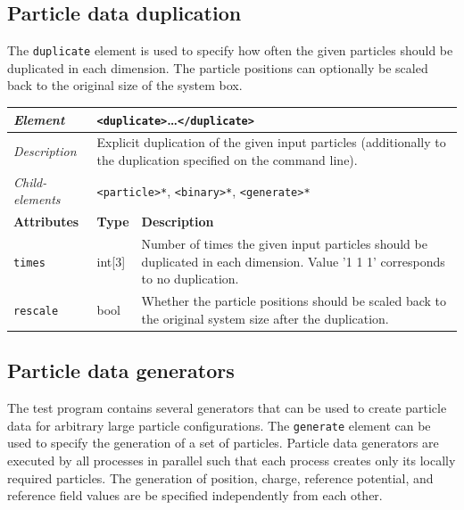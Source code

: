 \subsection*{Particle data duplication}

\noindent
The \texttt{duplicate} element is used to specify how often the given particles should be duplicated in each dimension.
The particle positions can optionally be scaled back to the original size of the system box.

\begin{center}
\small
\begin{tabular}{|p{3cm}|p{1.5cm}|p{8.5cm}|}
  \hline
  \textit{Element}        & \multicolumn{2}{p{10cm}|}{\texttt{<duplicate>}\dots\texttt{</duplicate>}} \\ \hline
  \textit{Description}    & \multicolumn{2}{p{10cm}|}{Explicit duplication of the given input particles (additionally to the duplication specified on the command line).} \\ \hline
  \textit{Child-elements} & \multicolumn{2}{p{10cm}|}{\texttt{<particle>*}, \texttt{<binary>*}, \texttt{<generate>*}} \\ \hline
  \hline
  \textbf{Attributes}     & \textbf{Type} & \textbf{Description} \\ \hline
  \texttt{times}          & int[3]        & Number of times the given input particles should be duplicated in each dimension. Value '1 1 1' corresponds to no duplication. \\ \hline
  \texttt{rescale}        & bool          & Whether the particle positions should be scaled back to the original system size after the duplication. \\ \hline
\end{tabular}
\end{center}

\subsection*{Particle data generators}

\noindent
The test program contains several generators that can be used to create particle data for arbitrary large particle configurations.
The \texttt{generate} element can be used to specify the generation of a set of particles.
Particle data generators are executed by all processes in parallel such that each process creates only its locally required particles.
The generation of position, charge, reference potential, and reference field values are be specified independently from each other.


